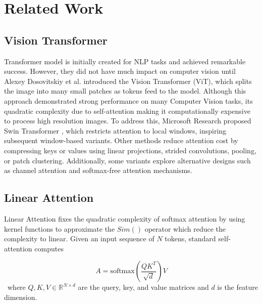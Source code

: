 \section{Related Work}

\subsection{Vision Transformer}
Transformer \cite{vaswani2017attention} model is initially created for NLP tasks and achieved remarkable success. However, they did not have much impact on computer vision until Alexey Dosovitskiy et al. \cite{rao2021dynamicvit} introduced the Vision Transformer (ViT), which splits the image into many small patches as tokens feed to the model. Although this approach demonstrated strong performance on many Computer Vision tasks, its quadratic complexity due to self-attention making it computationally expensive to process high resolution images. To address this, Microsoft Research proposed Swin Transformer \cite{liu2021swin}, which restricts attention to local windows, inspiring subsequent window-based variants. Other methods reduce attention cost by compressing keys or values using linear projections, strided convolutions, pooling, or patch clustering. Additionally, some variants explore alternative designs such as channel attention and softmax-free attention mechanisms.

\subsection{Linear Attention}
Linear Attention \cite{shen2021efficient} fixes the quadratic complexity of softmax attention by using kernel functions to approximate the \(Sim()\) operator which reduce the complexity to linear.
Given an input sequence of $N$ tokens, standard self-attention computes

\begin{equation}
  A = \text{softmax}(\frac{QK^T}{\sqrt{d}}) V
\end{equation}
\
where $Q,K,V \in \mathbb{R}^{N \times d}$ are the query, key, and value matrices and $d$ is the feature dimension.

